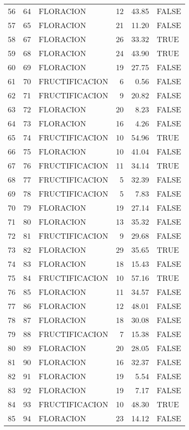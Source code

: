 \begin{table}[ht]
\begin{tabular}{rllrrl}
  56 & 64 & FLORACION &  12 & 43.85 & FALSE \\ 
  57 & 65 & FLORACION &  21 & 11.20 & FALSE \\ 
  58 & 67 & FLORACION &  26 & 33.32 & TRUE \\ 
  59 & 68 & FLORACION &  24 & 43.90 & TRUE \\ 
  60 & 69 & FLORACION &  19 & 27.75 & FALSE \\ 
  61 & 70 & FRUCTIFICACION &   6 & 0.56 & FALSE \\ 
  62 & 71 & FRUCTIFICACION &   9 & 20.82 & FALSE \\ 
  63 & 72 & FLORACION &  20 & 8.23 & FALSE \\ 
  64 & 73 & FLORACION &  16 & 4.26 & FALSE \\ 
  65 & 74 & FRUCTIFICACION &  10 & 54.96 & TRUE \\ 
  66 & 75 & FLORACION &  10 & 41.04 & FALSE \\ 
  67 & 76 & FRUCTIFICACION &  11 & 34.14 & TRUE \\ 
  68 & 77 & FRUCTIFICACION &   5 & 32.39 & FALSE \\ 
  69 & 78 & FRUCTIFICACION &   5 & 7.83 & FALSE \\ 
  70 & 79 & FLORACION &  19 & 27.14 & FALSE \\ 
  71 & 80 & FLORACION &  13 & 35.32 & FALSE \\ 
  72 & 81 & FRUCTIFICACION &   9 & 29.68 & FALSE \\ 
  73 & 82 & FLORACION &  29 & 35.65 & TRUE \\ 
  74 & 83 & FLORACION &  18 & 15.43 & FALSE \\ 
  75 & 84 & FRUCTIFICACION &  10 & 57.16 & TRUE \\ 
  76 & 85 & FLORACION &  11 & 34.57 & FALSE \\ 
  77 & 86 & FLORACION &  12 & 48.01 & FALSE \\ 
  78 & 87 & FLORACION &  18 & 30.08 & FALSE \\ 
  79 & 88 & FRUCTIFICACION &   7 & 15.38 & FALSE \\ 
  80 & 89 & FLORACION &  20 & 28.05 & FALSE \\ 
  81 & 90 & FLORACION &  16 & 32.37 & FALSE \\ 
  82 & 91 & FLORACION &  19 & 5.54 & FALSE \\ 
  83 & 92 & FLORACION &  19 & 7.17 & FALSE \\ 
  84 & 93 & FRUCTIFICACION &  10 & 48.30 & TRUE \\ 
  85 & 94 & FLORACION &  23 & 14.12 & FALSE \\ 

\end{tabular}
\end{table}
